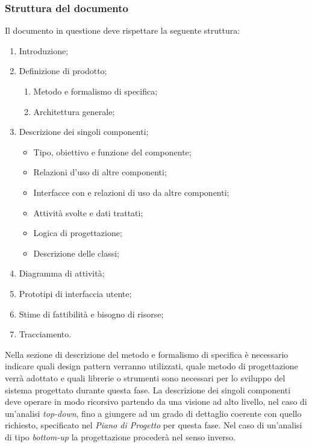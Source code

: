     \subsubsection{Struttura del documento}
        Il documento in questione deve rispettare la seguente struttura:
        \begin{enumerate}
        
        
        \item Introduzione;
        \item Definizione di prodotto;
        \begin{enumerate}
        \item Metodo e formalismo di specifica;
        \item Architettura generale;
        \end{enumerate}
        \item Descrizione dei singoli componenti;
        \begin{itemize}
        \item Tipo, obiettivo e funzione del componente;
        \item Relazioni d’uso di altre componenti;
        \item Interfacce con e relazioni di uso da altre componenti;
        \item Attività svolte e dati trattati;
        \item Logica di progettazione;
        \item Descrizione delle classi;
        \end{itemize}
        \item Diagramma di attività;
        \item Prototipi di interfaccia utente;
        \item Stime di fattibilità e bisogno di risorse;
        \item Tracciamento.
        \end{enumerate}
        Nella sezione di descrizione del metodo e formalismo di specifica è necessario  indicare quali design pattern verranno utilizzati, quale metodo di progettazione verrà adottato e quali librerie o strumenti sono necessari per lo sviluppo del sistema progettato durante questa fase. La descrizione dei singoli componenti deve operare in modo ricorsivo partendo da una visione ad alto livello, nel caso di un’analisi \emph{top-down}, fino a giungere ad un grado di dettaglio coerente con quello richiesto, specificato nel \emph{Piano di Progetto} per questa fase. Nel caso di un’analisi di tipo \emph{bottom-up} la progettazione procederà nel senso inverso.  

